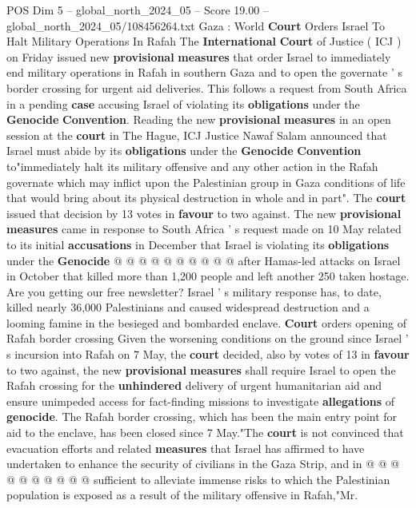 \begin{textsample}{POS Dim 5 – global\_north\_2024\_05 – Score 19.00 – global\_north\_2024\_05/108456264.txt}  \label{ex:f5_pos_173}
Gaza : World \textbf{Court} Orders Israel To Halt Military Operations In Rafah The \textbf{International} \textbf{Court} of Justice ( ICJ ) on Friday issued new \textbf{provisional} \textbf{measures} that order Israel to immediately end military operations in Rafah in southern Gaza and to open the governate ' s border crossing for urgent aid deliveries.
This follows a request from South Africa in a pending \textbf{case} accusing Israel of violating its \textbf{obligations} under the \textbf{Genocide} \textbf{Convention}.
Reading the new \textbf{provisional} \textbf{measures} in an open session at the \textbf{court} in The Hague, ICJ Justice Nawaf Salam announced that Israel must abide by its \textbf{obligations} under the \textbf{Genocide} \textbf{Convention} to"immediately halt its military offensive and any other action in the Rafah governate which may inflict upon the Palestinian group in Gaza conditions of life that would bring about its physical destruction in whole and in part".
The \textbf{court} issued that decision by 13 votes in \textbf{favour} to two against.
The new \textbf{provisional} \textbf{measures} came in response to South Africa ' s request made on 10 May related to its initial \textbf{accusations} in December that Israel is violating its \textbf{obligations} under the \textbf{Genocide} @ @ @ @ @ @ @ @ @ @ after Hamas-led attacks on Israel in October that killed more than 1,200 people and left another 250 taken hostage.
Are you getting our free newsletter?
Israel ' s military response has, to date, killed nearly 36,000 Palestinians and caused widespread destruction and a looming famine in the besieged and bombarded enclave. \textbf{Court} orders opening of Rafah border crossing Given the worsening conditions on the ground since Israel ' s incursion into Rafah on 7 May, the \textbf{court} decided, also by votes of 13 in \textbf{favour} to two against, the new \textbf{provisional} \textbf{measures} shall require Israel to open the Rafah crossing for the \textbf{unhindered} delivery of urgent humanitarian aid and ensure unimpeded access for fact-finding missions to investigate \textbf{allegations} of \textbf{genocide}.
The Rafah border crossing, which has been the main entry point for aid to the enclave, has been closed since 7 May."The \textbf{court} is not convinced that evacuation efforts and related \textbf{measures} that Israel has affirmed to have undertaken to enhance the security of civilians in the Gaza Strip, and in @ @ @ @ @ @ @ @ @ @ sufficient to alleviate immense risks to which the Palestinian population is exposed as a result of the military offensive in Rafah,"Mr.

\end{textsample}
